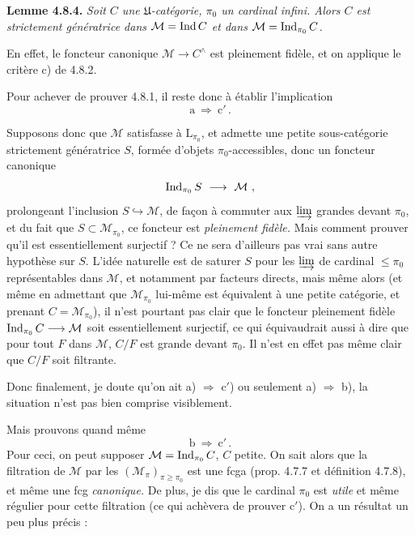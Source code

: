\textbf{Lemme 4.8.4.} \textit{Soit $C$ une $\mathfrak{U}$-catégorie, $\pi_0$ un cardinal infini. Alors $C$ est strictement génératrice dans $\mathcal{M}=\operatorname{Ind} C$ et dans $\mathcal{M}=\operatorname{Ind}_{\pi_0}C$.}

En effet, le foncteur canonique $\mathcal{M}\longrightarrow C^\wedge$ est pleinement fidèle, et on applique le critère c) de 4.8.2.

Pour achever de prouver 4.8.1, il reste donc à établir l'implication
\[
\mathrm{a} \ \Longrightarrow \ \mathrm{c}' \, .
\]


Supposons donc que $\mathcal{M}$ satisfasse à $\mathrm{L}_{\pi_0}$, et admette une petite sous-catégorie strictement génératrice $S$, formée d'objets $\pi_0$-accessibles, donc un foncteur canonique
\[
\Ind_{\pi_0}S \ \longrightarrow \ \mathcal{M} \ ,
\]
prolongeant l'inclusion $S\hookrightarrow\mathcal{M}$, de façon à commuter aux $\varinjlim$ grandes devant $\pi_0$, et du fait que $S\subset\mathcal{M}_{\pi_0}$, ce foncteur est \textit{pleinement fidèle.} Mais comment prouver qu'il est essentiellement surjectif ? Ce ne sera d'ailleurs pas vrai sans autre hypothèse sur $S$. L'idée naturelle est de saturer $S$ pour les $\varinjlim$
de cardinal $\leqslant\pi_0$ représentables dans $\mathcal{M}$, et notamment par facteurs directs, mais même alors (et même en admettant que $\mathcal{M}_{\pi_0}$ lui-même est équivalent à une petite catégorie, et prenant $C=\mathcal{M}_{\pi_0}$), il n'est pourtant pas clair que le foncteur pleinement fidèle $\operatorname{Ind}_{\pi_0}C\longrightarrow\mathcal{M}$ soit essentiellement surjectif, ce qui équivaudrait aussi à dire que pour tout $F$ dans $\mathcal{M}$, $C/F$ est grande devant $\pi_0$. Il n'est en effet pas même clair que $C/F$ soit filtrante.

Donc finalement, je doute qu'on ait a) $\Longrightarrow$ c$'$) ou seulement a) $\Longrightarrow$ b), la situation n'est pas bien comprise visiblement.

Mais prouvons quand même
\[
\mathrm{b} \ \Longrightarrow \ \mathrm{c}' \, .
\]
Pour ceci, on peut supposer $\mathcal{M}=\operatorname{Ind}_{\pi_0}C$, $C$ petite. On sait alors que la filtration de $\mathcal{M}$ par les $(\mathcal{M}_\pi)_{\pi\geqslant\pi_0}$ est une fcga (prop. 4.7.7 et définition 4.7.8), et même une fcg \textit{canonique.} De plus, je dis que le cardinal $\pi_0$ est \textit{utile} et même régulier pour cette filtration (ce qui achèvera de prouver c$'$). On a un résultat un peu plus précis :


